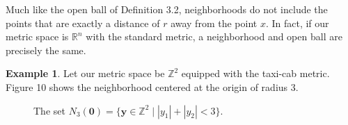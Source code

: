 \documentclass{article}
\newcommand{\R}{\mathbb{R}}
\newcommand{\y}{\mathbf{y}}
\newcommand{\Z}{\mathbb{Z}}
\theoremstyle{definition}
\newtheorem{example}{Example}[section]
\begin{document}
	Much like the open ball of Definition 3.2, neighborhoods do not include the points that are exactly a distance of $ r $ away from the point $ x $. In fact, if our metric space is $ \R^n $ with the standard metric, a neighborhood and open ball are precisely the same. 
	\begin{example}
		Let our metric space be $ \Z^2 $ equipped with the taxi-cab metric. Figure 10 shows the neighborhood centered at the origin of radius 3. 
		\begin{figure}[h]
			\centering
			\caption{The set $ N_{3}(\mathbf{0})=\{\y\in\Z^2\mid|y_1|+|y_2|<3 \} $.}
		\end{figure}
	\end{example} 
	
\end{document}
